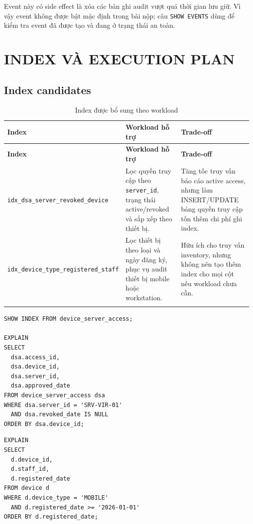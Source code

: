 \documentclass[12pt, a4paper, oneside, openany]{report}
\newcommand{\dbid}[1]{{\normalfont\ttfamily\footnotesize\nolinkurl{#1}}}
\newcommand{\tabdbid}[1]{{\normalfont\ttfamily\scriptsize\nolinkurl{#1}}}
\begin{document}
Event này có side effect là xóa các bản ghi audit vượt quá thời gian lưu giữ. Vì vậy event không được bật mặc định trong bài nộp; câu \texttt{SHOW EVENTS} dùng để kiểm tra event đã được tạo và đang ở trạng thái an toàn.

\chapter{INDEX VÀ EXECUTION PLAN}

\section{Index candidates}

\begin{longtable}{|L{5.1cm}|L{4.2cm}|L{4.3cm}|}
\hline
\normalfont\normalsize\textbf{Index} & \textbf{Workload hỗ trợ} & \textbf{Trade-off} \\
\hline
\endfirsthead
\hline
\normalfont\normalsize\textbf{Index} & \textbf{Workload hỗ trợ} & \textbf{Trade-off} \\
\hline
\endhead
\tabdbid{idx_dsa_server_revoked_device} & Lọc quyền truy cập theo \dbid{server_id}, trạng thái active/revoked và sắp xếp theo thiết bị. & Tăng tốc truy vấn báo cáo active access, nhưng làm INSERT/UPDATE bảng quyền truy cập tốn thêm chi phí ghi index. \\
\hline
\tabdbid{idx_device_type_registered_staff} & Lọc thiết bị theo loại và ngày đăng ký, phục vụ audit thiết bị mobile hoặc workstation. & Hữu ích cho truy vấn inventory, nhưng không nên tạo thêm index cho mọi cột nếu workload chưa cần. \\
\hline
\caption{Index được bổ sung theo workload}
\end{longtable}

\begin{lstlisting}[caption={SHOW INDEX và EXPLAIN cho truy vấn active access}]
SHOW INDEX FROM device_server_access;

EXPLAIN
SELECT
  dsa.access_id,
  dsa.device_id,
  dsa.server_id,
  dsa.approved_date
FROM device_server_access dsa
WHERE dsa.server_id = 'SRV-VIR-01'
  AND dsa.revoked_date IS NULL
ORDER BY dsa.device_id;
\end{lstlisting}

\begin{lstlisting}[caption={EXPLAIN cho truy vấn lọc thiết bị theo loại và ngày đăng ký}]
EXPLAIN
SELECT
  d.device_id,
  d.staff_id,
  d.registered_date
FROM device d
WHERE d.device_type = 'MOBILE'
  AND d.registered_date >= '2026-01-01'
ORDER BY d.registered_date;
\end{lstlisting}
\end{document}
